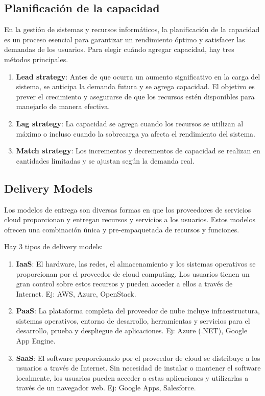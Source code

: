 \documentclass{article}
\begin{document}
		\subsection{Planificación de la capacidad}
		En la gestión de sistemas y recursos informáticos, la planificación de la capacidad es un proceso esencial para garantizar un rendimiento óptimo y satisfacer las demandas de los usuarios. Para elegir cuándo agregar capacidad, hay tres métodos principales.
		\begin{enumerate}
			
			\item {\textbf{Lead strategy}}: Antes de que ocurra un aumento significativo en la carga del sistema, se anticipa la demanda futura y se agrega capacidad. El objetivo es prever el crecimiento y asegurarse de que los recursos estén disponibles para manejarlo de manera efectiva.
			
			\item {\textbf{Lag strategy}}: La capacidad se agrega cuando los recursos se utilizan al máximo o incluso cuando la sobrecarga ya afecta el rendimiento del sistema.
			
			\item {\textbf{Match strategy}}: Los incrementos y decrementos de capacidad se realizan en cantidades limitadas y se ajustan según la demanda real.
			
		\end{enumerate}
		
		\subsection{Delivery Models}
		Los modelos de entrega son diversas formas en que los proveedores de servicios cloud proporcionan y entregan recursos y servicios a los usuarios. Estos modelos ofrecen una combinación única y pre-empaquetada de recursos y funciones.
		
		Hay 3 tipos de delivery models:
		\begin{enumerate}
			
			\item {\textbf{IaaS}}: El hardware, las redes, el almacenamiento y los sistemas operativos se proporcionan por el proveedor de cloud computing. Los usuarios tienen un gran control sobre estos recursos y pueden acceder a ellos a través de Internet. Ej: AWS, Azure, OpenStack.
			
			\item {\textbf{PaaS}}: La plataforma completa del proveedor de nube incluye infraestructura, sistemas operativos, entorno de desarrollo, herramientas y servicios para el desarrollo, prueba y despliegue de aplicaciones. Ej: Azure (.NET), Google App Engine.
			
			\item {\textbf{SaaS}}: El software proporcionado por el proveedor de cloud se distribuye a los usuarios a través de Internet. Sin necesidad de instalar o mantener el software localmente, los usuarios pueden acceder a estas aplicaciones y utilizarlas a través de un navegador web. Ej: Google Apps, Salesforce.
			
		\end{enumerate}
		
\end{document}
